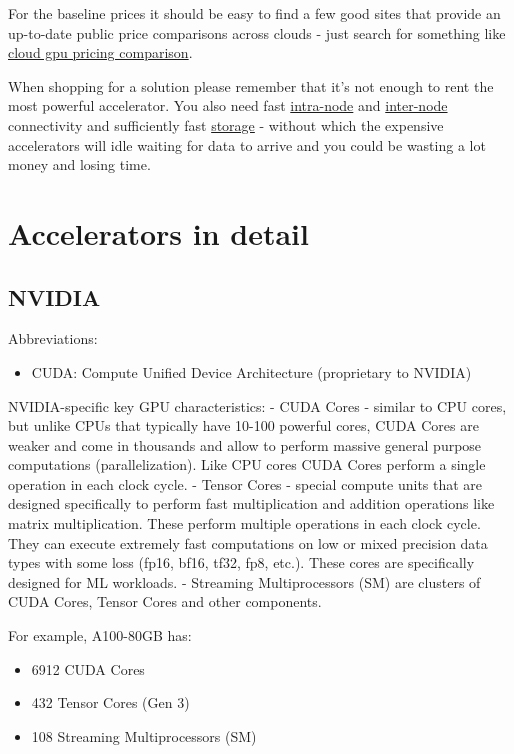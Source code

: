 \documentclass[
]{report}
\providecommand{\tightlist}{%
  \setlength{\itemsep}{0pt}\setlength{\parskip}{0pt}}\usepackage{longtable,booktabs,array}
\begin{document}
For the baseline prices it should be easy to find a few good sites that
provide an up-to-date public price comparisons across clouds - just
search for something like
\href{https://www.google.com/search?q=cloud+gpu+pricing+comparison}{cloud
gpu pricing comparison}.

When shopping for a solution please remember that it's not enough to
rent the most powerful accelerator. You also need fast
\href{../../network\#intra-node-networking}{intra-node} and
\href{../../network\#inter-node-networking}{inter-node} connectivity and
sufficiently fast \href{../../storage}{storage} - without which the
expensive accelerators will idle waiting for data to arrive and you
could be wasting a lot money and losing time.

\section{Accelerators in detail}\label{accelerators-in-detail}

\subsection{NVIDIA}\label{nvidia}

Abbreviations:

\begin{itemize}
\tightlist
\item
  CUDA: Compute Unified Device Architecture (proprietary to NVIDIA)
\end{itemize}

NVIDIA-specific key GPU characteristics: - CUDA Cores - similar to CPU
cores, but unlike CPUs that typically have 10-100 powerful cores, CUDA
Cores are weaker and come in thousands and allow to perform massive
general purpose computations (parallelization). Like CPU cores CUDA
Cores perform a single operation in each clock cycle. - Tensor Cores -
special compute units that are designed specifically to perform fast
multiplication and addition operations like matrix multiplication. These
perform multiple operations in each clock cycle. They can execute
extremely fast computations on low or mixed precision data types with
some loss (fp16, bf16, tf32, fp8, etc.). These cores are specifically
designed for ML workloads. - Streaming Multiprocessors (SM) are clusters
of CUDA Cores, Tensor Cores and other components.

For example, A100-80GB has:

\begin{itemize}
\tightlist
\item
  6912 CUDA Cores
\item
  432 Tensor Cores (Gen 3)
\item
  108 Streaming Multiprocessors (SM)
\end{itemize}
\end{document}
